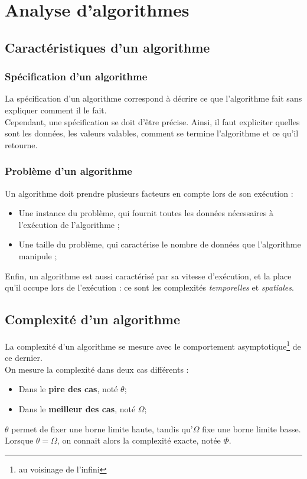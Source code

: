 \documentclass{report}
\begin{document}
\chapter{Analyse d'algorithmes}
\section{Caractéristiques d'un algorithme}
\subsection{Spécification d'un algorithme}
La spécification d'un algorithme correspond à décrire ce que l'algorithme fait sans expliquer comment il le fait.\\
Cependant, une spécification se doit d'être précise.
Ainsi, il faut expliciter quelles sont les données, les valeurs valables, comment se termine l'algorithme et ce qu'il retourne.

\subsection{Problème d'un algorithme}
Un algorithme doit prendre plusieurs facteurs en compte lors de son exécution :
\begin{itemize}
    \item{Une instance du problème, qui fournit toutes les données nécessaires à l'exécution de l'algorithme ;}
    \item{Une taille du problème, qui caractérise le nombre de données que l'algorithme manipule ;}
\end{itemize}
Enfin, un algorithme est aussi caractérisé par sa vitesse d'exécution, et la place qu'il occupe lors de l'exécution : ce sont les complexités \emph{temporelles} et \emph{spatiales}.
\section{Complexité d'un algorithme}
La complexité d'un algorithme se mesure avec le comportement asymptotique\footnote{au voisinage de l'infini} de ce dernier.\\
On mesure la complexité dans deux cas différents :
\begin{itemize}
    \item{Dans le \textbf{pire des cas}, noté $\theta$;}
    \item{Dans le \textbf{meilleur des cas}, noté $\Omega$;}
\end{itemize}
$\theta$ permet de fixer une borne limite haute, tandis qu'$\Omega$ fixe une borne limite basse.\\
Lorsque $\theta = \Omega$, on connait alors la complexité exacte, notée $\Phi$.
\end{document}
